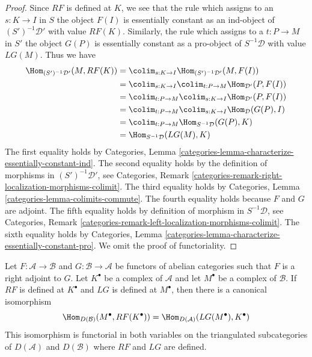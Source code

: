 \begin{proof}
Since $RF$ is defined at $K$, we see that the rule which assigns to an
$s : K \to I$ in $S$ the object $F(I)$ is essentially
constant as an ind-object of $(S')^{-1}\mathcal{D}'$ with value $RF(K)$.
Similarly, the rule which assigns to a $t : P \to M$ in $S'$
the object $G(P)$ is essentially constant as a pro-object of
$S^{-1}\mathcal{D}$ with value $LG(M)$. Thus we have
\begin{align*}
\Hom_{(S')^{-1}\mathcal{D}'}(M, RF(K))
& =
\colim_{s : K \to I} \Hom_{(S')^{-1}\mathcal{D}'}(M, F(I)) \\
& =
\colim_{s : K \to I} \colim_{t : P \to M} \Hom_{\mathcal{D}'}(P, F(I)) \\
& =
\colim_{t : P \to M} \colim_{s : K \to I} \Hom_{\mathcal{D}'}(P, F(I)) \\
& =
\colim_{t : P \to M} \colim_{s : K \to I} \Hom_{\mathcal{D}}(G(P), I) \\
& =
\colim_{t : P \to M} \Hom_{S^{-1}\mathcal{D}}(G(P), K) \\
& =
\Hom_{S^{-1}\mathcal{D}}(LG(M), K)
\end{align*}
The first equality holds by
Categories, Lemma \ref{categories-lemma-characterize-essentially-constant-ind}.
The second equality holds by the definition of morphisms in
$(S')^{-1}\mathcal{D}'$, see Categories, Remark
\ref{categories-remark-right-localization-morphisms-colimit}.
The third equality holds by
Categories, Lemma \ref{categories-lemma-colimits-commute}.
The fourth equality holds because $F$ and $G$ are adjoint.
The fifth equality holds by definition of morphism
in $S^{-1}\mathcal{D}$, see Categories, Remark
\ref{categories-remark-left-localization-morphisms-colimit}.
The sixth equality holds by
Categories, Lemma \ref{categories-lemma-characterize-essentially-constant-pro}.
We omit the proof of functoriality.
\end{proof}

\begin{lemma}
\label{lemma-pre-derived-adjoint-functors}
Let $F : \mathcal{A} \to \mathcal{B}$ and $G : \mathcal{B} \to \mathcal{A}$
be functors of abelian categories such that $F$ is a right adjoint to $G$.
Let $K^\bullet$ be a complex of $\mathcal{A}$ and let $M^\bullet$ be
a complex of $\mathcal{B}$. If $RF$ is defined at $K^\bullet$
and $LG$ is defined at $M^\bullet$, then there is a canonical isomorphism
$$
\Hom_{D(\mathcal{B})}(M^\bullet, RF(K^\bullet)) =
\Hom_{D(\mathcal{A})}(LG(M^\bullet), K^\bullet)
$$
This isomorphism is functorial in both variables on the triangulated
subcategories of $D(\mathcal{A})$ and $D(\mathcal{B})$
where $RF$ and $LG$ are defined.
\end{lemma}

